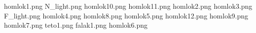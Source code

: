 homlok1.png
N_light.png
homlok10.png
homlok11.png
homlok2.png
homlok3.png
F_light.png
homlok4.png
homlok8.png
homlok5.png
homlok12.png
homlok9.png
homlok7.png
teto1.png
falak1.png
homlok6.png
